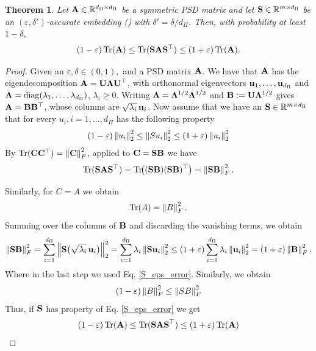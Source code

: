 \documentclass[11pt]{article}
\theoremstyle{plain}
\newtheorem{theorem}{Theorem}[section]
\theoremstyle{definition}
\theoremstyle{remark}
\begin{document}
\begin{theorem}
\label{thm:k1}
\leanok
{}
Let $\mathbf{A}\in\mathbb{R}^{d_{\Pi}\times d_{\Pi}}$ be a symmetric PSD matrix and let $\mathbf{S}\in\mathbb{R}^{m\times d_{\Pi}}$ be an $(\varepsilon,\delta')$-accurate embedding () with $\delta'=\delta/d_{\Pi}$.
Then, with probability at least $1-\delta$,
\begin{equation}
      (1-\varepsilon)\mathop{\mathrm{Tr}}(\mathbf{A})\le\mathop{\mathrm{Tr}}(\mathbf{S}\mathbf{A}\mathbf{S}^{\top})
    \le(1+\varepsilon)\mathop{\mathrm{Tr}}(\mathbf{A}).\label{trace_eps_err}
\end{equation}
\end{theorem}

\begin{proof}
Given an $\varepsilon,\delta\in (0,1),$ and a PSD matrix $\mathbf{A}$. We have that $\mathbf{A}$ has the eigendecomposition
$\mathbf{A}=\mathbf{U}\mathbf{\Lambda}\mathbf{U}^{\top}$, with orthonormal eigenvectors $\mathbf{\boldsymbol{u}}_{1},\dots,\mathbf{\boldsymbol{u}}_{d_{\Pi}}$ and $\mathbf{\Lambda}=\mathop{\mathrm{diag}}(\lambda_{1},\dots,\lambda_{d_{\Pi}})$, $\lambda_{i}\ge0$.
Writing $\mathbf{\Lambda}=\mathbf{\Lambda}^{1/2}\mathbf{\Lambda}^{1/2}$ and $\mathbf{B}:=\mathbf{U}\mathbf{\Lambda}^{1/2}$ gives $\mathbf{A}=\mathbf{B}\mathbf{B}^{\top}$, whose columns are $\sqrt{\lambda_{i}}\,\mathbf{\boldsymbol{u}}_{i}$.
Now assume that we have an $\mathbf{S}\in \mathbb{R}^{m\times d_{\Pi}}$ that for every $u_i,i=1,...,d_{\Pi}$ has the following property \begin{equation}
    (1-\varepsilon)\left\| u_i \right\|^2_{2}\le\left\| Su_i \right\|^2_{2}\le(1+\varepsilon)\left\| u_i \right\|^2_{2}\label{S_eps_error}
\end{equation}
By $\mathop{\mathrm{Tr}}(\mathbf{C}\mathbf{C}^{\top})=\left\| \mathbf{C} \right\|^2_{F}$, applied to $\mathbf{C}=\mathbf{S}\mathbf{B}$ we have
\begin{equation}
  \mathop{\mathrm{Tr}}(\mathbf{S}\mathbf{A}\mathbf{S}^{\top})
  =\mathop{\mathrm{Tr}}\!\bigl((\mathbf{S}\mathbf{B})(\mathbf{S}\mathbf{B})^{\top}\bigr)
  =\left\| \mathbf{S}\mathbf{B} \right\|^2_{F}.
\end{equation}

Similarly, for $C=A$ we obtain 
\begin{equation}
\mathop{\mathrm{Tr}}(A)=\left\| B \right\|^2_{F}.    
\end{equation}
Summing over the columns of $\mathbf{B}$ and discarding the vanishing terms, we obtain
\begin{equation}\label{eq:SB-colsum}
  \left\| \mathbf{S}\mathbf{B} \right\|^2_{F}
  =\sum_{i=1}^{d_{\Pi}}\left\| \mathbf{S}\bigl(\sqrt{\lambda_{i}}\,\mathbf{\boldsymbol{u}}_{i}\bigr) \right\|^2_{2}
  =\sum_{i=1}^{d_{\Pi}}\lambda_{i}\left\| \mathbf{S}\mathbf{\boldsymbol{u}}_{i} \right\|^2_{2}\le(1+\varepsilon)\sum_{i=1}^{d_{\Pi}}\lambda_{i}\left\| \mathbf{\boldsymbol{u}}_{i} \right\|^2_{2}=(1+\varepsilon)\left\| \mathbf{B} \right\|^2_{F}.
\end{equation}
Where in the last step we used Eq. \eqref{S_eps_error}. Similarly, we obtain  $$(1-\varepsilon)\left\| B \right\|^2_{F}\le\left\| SB \right\|^2_{F}$$
Thus, if $\mathbf{S}$ has property of Eq. \eqref{S_eps_error} we get
$$  (1-\varepsilon)\mathop{\mathrm{Tr}}(\mathbf{A})\le\mathop{\mathrm{Tr}}(\mathbf{S}\mathbf{A}\mathbf{S}^{\top})
    \le(1+\varepsilon)\mathop{\mathrm{Tr}}(\mathbf{A})$$


\end{proof}
\end{document}
